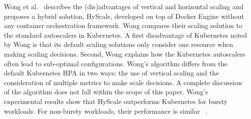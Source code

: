 Wong et al.~\citep{hyscale} describes the (dis)advantages of vertical and horizontal scaling and proposes a hybrid solution, HyScale, developed on top of Docker Engine without any container orchestration framework. 
%
%
%
%
Wong compares their scaling solution to the standard autoscalers in Kubernetes. A first disadvantage of Kubernetes noted by Wong is that its default scaling solutions only consider one resource when making scaling decisions. Second, Wong explains how the Kubernetes autoscalers often lead to sub-optimal configurations. 
Wong's algorithm differs from the default Kubernetes HPA in two ways: the use of vertical scaling and the consideration of multiple metrics to make scale decisions. 
A complete discussion of the algorithm does not fall within the scope of this paper. 
Wong's experimental results show that HyScale outperforms Kubernetes for bursty workloads. For non-bursty workloads, their performance is similar
~\citep{hyscale}.

